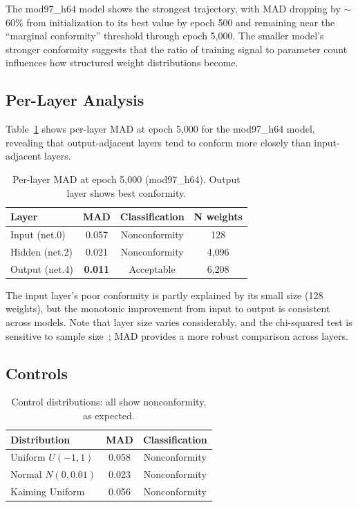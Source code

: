 \documentclass[11pt]{article}
\begin{document}
The mod97\_h64 model shows the strongest trajectory, with MAD dropping by $\sim$60\% from initialization to its best value by epoch 500 and remaining near the ``marginal conformity'' threshold through epoch 5{,}000. The smaller model's stronger conformity suggests that the ratio of training signal to parameter count influences how structured weight distributions become.

\subsection{Per-Layer Analysis}

Table~\ref{tab:layers} shows per-layer MAD at epoch 5{,}000 for the mod97\_h64 model, revealing that output-adjacent layers tend to conform more closely than input-adjacent layers.

\begin{table}[h]
\centering
\small
\caption{Per-layer MAD at epoch 5{,}000 (mod97\_h64). Output layer shows best conformity.}
\label{tab:layers}
\begin{tabular}{lccc}
\toprule
\textbf{Layer} & \textbf{MAD} & \textbf{Classification} & \textbf{N weights} \\
\midrule
Input (net.0)  & 0.057 & Nonconformity & 128 \\
Hidden (net.2) & 0.021 & Nonconformity & 4{,}096 \\
Output (net.4) & \textbf{0.011} & Acceptable & 6{,}208 \\
\bottomrule
\end{tabular}
\end{table}

The input layer's poor conformity is partly explained by its small size (128 weights), but the monotonic improvement from input to output is consistent across models. Note that layer size varies considerably, and the chi-squared test is sensitive to sample size~\cite{nigrini2012}; MAD provides a more robust comparison across layers.

\subsection{Controls}

\begin{table}[h]
\centering
\small
\caption{Control distributions: all show nonconformity, as expected.}
\label{tab:controls}
\begin{tabular}{lcc}
\toprule
\textbf{Distribution} & \textbf{MAD} & \textbf{Classification} \\
\midrule
Uniform $U(-1,1)$    & 0.058 & Nonconformity \\
Normal $N(0, 0.01)$  & 0.023 & Nonconformity \\
Kaiming Uniform      & 0.056 & Nonconformity \\
\bottomrule
\end{tabular}
\end{table}
\end{document}

